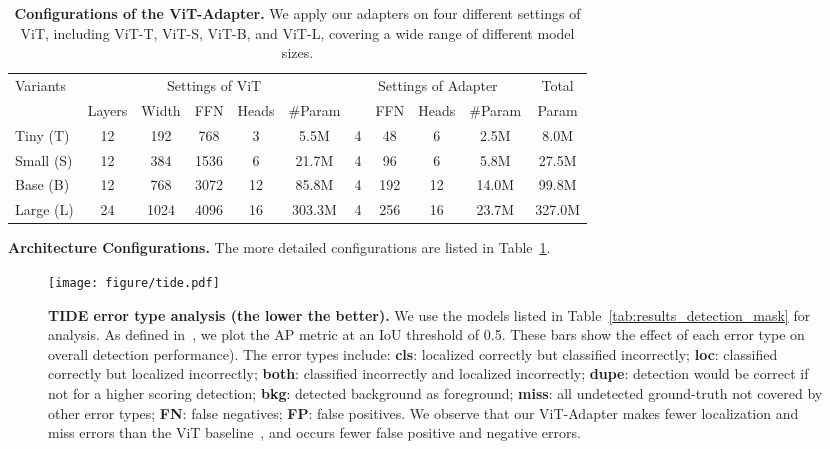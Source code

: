 \documentclass{article} \usepackage{iclr2023_conference,times}
\begin{document}
\begin{table}[t]\small
	\centering
	\renewcommand\arraystretch{1.0}
    \setlength\tabcolsep{2.3mm}
    \begin{tabular}{l|ccccc|cccc|c}
        \toprule
        \multirow{2}{*}{Variants} & \multicolumn{5}{c|}{Settings of ViT} & \multicolumn{4}{c|}{Settings of Adapter} & Total\\
         & Layers & Width & FFN & Heads & \#Param &  & FFN & Heads & \#Param& Param\\
	    \midrule
        Tiny (T)   & 12 & 192  & 768  & 3   & 5.5M   & 4 & 48  & 6  & 2.5M & 8.0M \\ 
        Small (S)  & 12 & 384  & 1536 & 6   & 21.7M  & 4 & 96  & 6  & 5.8M & 27.5M \\ 
        Base (B)   & 12 & 768  & 3072 & 12  & 85.8M  & 4 & 192 & 12 & 14.0M & 99.8M \\
        Large (L)  & 24 & 1024 & 4096 & 16  & 303.3M & 4 & 256 & 16 & 23.7M & 327.0M \\
	    \bottomrule
    \end{tabular}
    \caption{\textbf{Configurations of the ViT-Adapter.} 
    We apply our adapters on four different settings of ViT, including ViT-T, ViT-S, ViT-B, and ViT-L, covering a wide range of different model sizes.}
    \label{tab:architecture_configurations}
\end{table} 
\noindent \textbf{Architecture Configurations.}
\label{appendix_config}
The more detailed configurations are listed in Table~\ref{tab:architecture_configurations}.





\begin{figure}[t]
    \centering
    \texttt{[image: figure/tide.pdf]}
    \caption{
    \textbf{TIDE error type analysis (the lower the better). }
    We use the models listed in Table~\ref{tab:results_detection_mask} for analysis.
    As defined in~\citep{bolya2020tide}, we plot the AP metric at an IoU threshold of 0.5.
    These bars show the effect of each error type on overall detection performance).
    The error types include: 
    \textbf{cls}: localized correctly but classified incorrectly; 
    \textbf{loc}: classified correctly but localized incorrectly; 
    \textbf{both}: classified incorrectly and localized incorrectly; 
    \textbf{dupe}: detection would be correct if not for a higher scoring detection; 
    \textbf{bkg}: detected background as foreground; 
    \textbf{miss}: all undetected ground-truth not covered by other error types;
    \textbf{FN}: false negatives;
    \textbf{FP}: false positives.
    We observe that our ViT-Adapter makes fewer localization and miss errors than the ViT baseline~\citep{li2021benchmarking}, and occurs fewer false positive and negative errors.
        }
    \label{fig:tide}
\end{figure}
\end{document}
